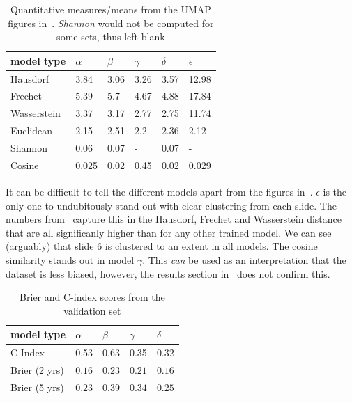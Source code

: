 \documentclass[10pt,twocolumn,letterpaper]{article}
\begin{document}
\begin{table}
\centering
  \begin{tabular}{|l l l l l l|}
    \hline 
    model type & $\alpha$ & $\beta$ & $\gamma$ & $\delta$ & $\epsilon$ \\
    \hline 
    Hausdorf & 3.84 & 3.06 & 3.26 & 3.57 & 12.98 \\
    Frechet & 5.39 & 5.7 & 4.67 & 4.88 & 17.84 \\
    Wasserstein & 3.37 & 3.17 & 2.77 & 2.75 & 11.74 \\
    \hline
    Euclidean & 2.15 & 2.51 & 2.2  & 2.36 & 2.12  \\
    Shannon & 0.06 & 0.07 & - & 0.07 & - \\
    Cosine & 0.025 & 0.02 & 0.45 & 0.02 & 0.029  \\
    \hline
  \end{tabular}
  \caption{Quantitative measures/means from the \gls{UMAP} figures in~. \textit{Shannon} would not be computed for some sets, thus left blank}
  \label{tab:quantitativeres}
\end{table}

It can be difficult to tell the different models apart from the figures in~. $\epsilon$ is the only one to undubitously stand out with clear clustering from each slide. The numbers from~ capture this in the Hausdorf, Frechet and Wasserstein distance that are all significanly higher than for any other trained model. We can see (arguably) that slide 6 is clustered to an extent in all models. The cosine similarity stands out in model $\gamma$. This \textit{can} be used as an interpretation that the dataset is less biased, however, the results section in~ does not confirm this. 

\begin{table}
\centering
  \begin{tabular}{l l l l l}
    model type & $\alpha$ & $\beta$ & $\gamma$ & $\delta$ \\
    \hline
    C-Index & 0.53 & 0.63 & 0.35 & 0.32 \\
    Brier (2 yrs) & $0.16$ & $0.23$ & $0.21$ & $0.16$  \\
    Brier (5 yrs) & $0.23$ & $0.39$ & $0.34$ & $0.25$  \\
    \hline
  \end{tabular}
  \caption{Brier and C-index scores from the validation set}
  \label{tab:combinedres}
\end{table}
\end{document}
